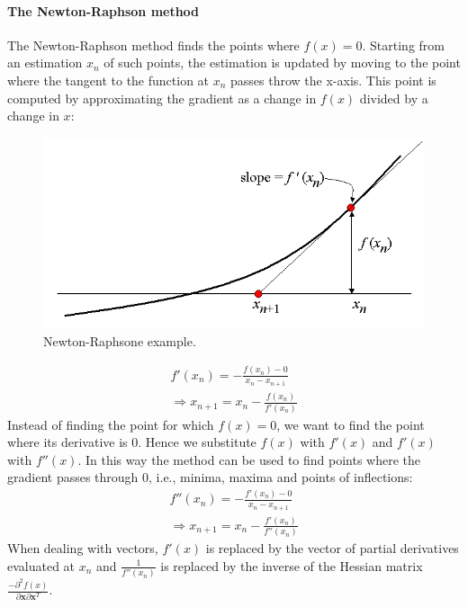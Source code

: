 \documentclass[12pt, letterpaper]{article}
\theoremstyle{definition}
\newcommand{\x}{\mathbf{x}}
\begin{document}
\paragraph{The Newton-Raphson method}
The Newton-Raphson method finds the points where $f(x)=0$. Starting from an estimation $x_n$ of such points, the estimation is updated by moving to the point where the tangent to the function at $x_n$ passes throw the x-axis. This point is computed by approximating the gradient as a change in $f(x)$ divided by a change in $x$:

\begin{figure}
\centering
\includegraphics[scale=0.3]{img/NewtonRaphson}
\caption{Newton-Raphsone example.}
\end{figure}

\begin{equation}
\begin{aligned}
f'(x_n) = -\frac{f(x_n)-0}{x_n -x_{n+1}}\\
\Rightarrow x_{n+1} = x_n -\frac{f(x_n)}{f'(x_n)}
\end{aligned}
\end{equation}
Instead of finding the point for which $f(x)=0$, we want to find the point where its derivative is $0$. Hence we substitute $f(x)$ with $f'(x)$ and $f'(x)$ with $f''(x)$. In this way the method can be used to find points where the gradient passes through $0$, i.e., minima, maxima and points of inflections:
\begin{equation}
\begin{aligned}
f''(x_n) = -\frac{f'(x_n)-0}{x_n -x_{n+1}}\\
\Rightarrow x_{n+1} = x_n -\frac{f'(x_n)}{f''(x_n)}
\end{aligned}
\end{equation}
When dealing with vectors, $f'(x)$ is replaced by the vector of partial derivatives evaluated at $x_n$ and $\frac{1}{f''(x_n)}$ is replaced by the inverse of the Hessian matrix $\frac{-\partial^2 f(x)}{\partial \x \partial \x^T}$.
\end{document}
